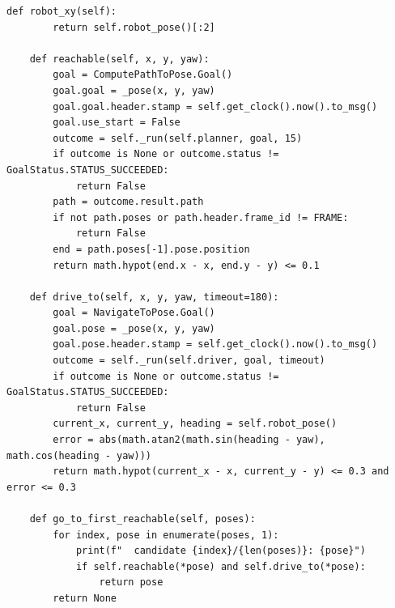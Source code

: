 \documentclass[11pt,a4paper]{book}
\begin{document}
\begin{lstlisting}[firstnumber=28]
    def robot_xy(self):
        return self.robot_pose()[:2]

    def reachable(self, x, y, yaw):
        goal = ComputePathToPose.Goal()
        goal.goal = _pose(x, y, yaw)
        goal.goal.header.stamp = self.get_clock().now().to_msg()
        goal.use_start = False
        outcome = self._run(self.planner, goal, 15)
        if outcome is None or outcome.status != GoalStatus.STATUS_SUCCEEDED:
            return False
        path = outcome.result.path
        if not path.poses or path.header.frame_id != FRAME:
            return False
        end = path.poses[-1].pose.position
        return math.hypot(end.x - x, end.y - y) <= 0.1

    def drive_to(self, x, y, yaw, timeout=180):
        goal = NavigateToPose.Goal()
        goal.pose = _pose(x, y, yaw)
        goal.pose.header.stamp = self.get_clock().now().to_msg()
        outcome = self._run(self.driver, goal, timeout)
        if outcome is None or outcome.status != GoalStatus.STATUS_SUCCEEDED:
            return False
        current_x, current_y, heading = self.robot_pose()
        error = abs(math.atan2(math.sin(heading - yaw), math.cos(heading - yaw)))
        return math.hypot(current_x - x, current_y - y) <= 0.3 and error <= 0.3

    def go_to_first_reachable(self, poses):
        for index, pose in enumerate(poses, 1):
            print(f"  candidate {index}/{len(poses)}: {pose}")
            if self.reachable(*pose) and self.drive_to(*pose):
                return pose
        return None
\end{lstlisting}
\end{document}
